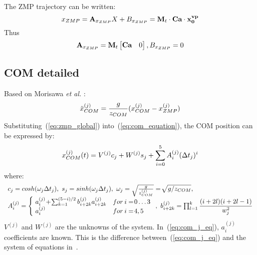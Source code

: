 \documentclass[journal]{IEEEtran}
\begin{document}
The ZMP trajectory can be written:
\begin{equation}
\label{eq:zmp_def}
x_{\mbox{\tiny ZMP}}=\mathbf{A}_{x_{\mbox{\tiny ZMP}}} X + B_{x_{\mbox{\tiny ZMP}}}=\textbf{M}_t\cdot\textbf{Ca}\cdot\mathbf{x^{vp}_0}
\end{equation}
Thus
\begin{equation}
\begin{split}
\mathbf{A}_{x_{\mbox{\tiny ZMP}}}=\textbf{M}_t
\begin{bmatrix}
\textbf{Ca} & 0
\end{bmatrix}, B_{x_{\mbox{\tiny ZMP}}}=0
\end{split}
\end{equation}

\subsection{COM detailed}
Based on Morisawa \textit{et al.} \cite{morisawa:humanoids:2006}:
\begin{equation}
\ddot{x}_{\mbox{\tiny COM}}^{(j)}=\dfrac{g}{z_{\mbox{\tiny COM}}}(x_{\mbox{\tiny COM}}^{(j)}-x_{\mbox{\tiny ZMP}}^{(j)})
\end{equation}
Substituting~(\ref{eq:zmp_global}) into~(\ref{eq:com_equation}), the COM position can be expressed by:
\begin{equation}
\label{eq:com_j_eq}
x_{\mbox{\tiny COM}}^{(j)}(t)=V^{(j)}c_{j}+W^{(j)}s_{j}+\sum_{i=0}^{5}A_{i}^{(j)}(\Delta t_{j})^{i}
\end{equation}
where:
\begin{equation}
\begin{array}{l}
c_{j}=\mbox{cosh}(\omega_{j}\Delta t_{j}), \ s_{j}=\mbox{sinh}(\omega_{j}\Delta t_{j}), \ \omega_{j}=\sqrt{\frac{g}{z_{\mbox{\tiny COM}}^{(j)}}}=\!\sqrt{g/z_{\mbox{\tiny COM}}}, \\
A_{i}^{(j)}=\left\{
\begin{array}{ll}
\!a_{i}^{(j)}\!+\!\sum_{k=1}^{(5-i)/2}b_{i+2k}^{(j)}a_{i+2k}^{(j)} &\mbox{for} \: i=\!0\ldots3\\
\!a_{i}^{(j)} &\mbox{for} \: i=\!4,5
\end{array}
\right., \ b_{i+2k}^{(j)}=\prod_{l=1}^{k}\dfrac{(i+2l)(i+2l-1)}{w_{j}^{2}}\nonumber
\end{array}
\end{equation}
$V^{(j)}$ and $W^{(j)}$ are the unknowns of the system. In~(\ref{eq:com_j_eq}), $a^{(j)}_{i}$ coefficients are known. This is the difference between~(\ref{eq:com_j_eq}) and the system of equations in~\cite{morisawa:humanoids:2006}.
\end{document}

